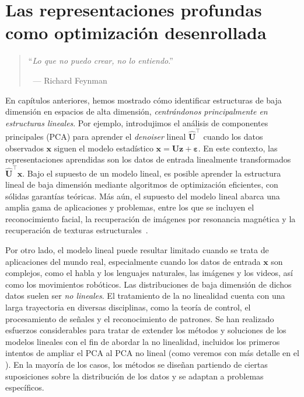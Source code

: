 \documentclass[../../book-main.tex]{subfiles}
\begin{document}
\chapter{Las representaciones profundas como optimización desenrollada}
\label{ch:deep-networks}

\begin{quote}
    \hfill    ``{\em Lo que no puedo crear, no lo entiendo}.''

    $~$ \hfill --- Richard Feynman
\end{quote}
\vspace{5mm}

En capítulos anteriores, hemos mostrado cómo identificar estructuras de baja dimensión
en espacios de alta dimensión, \textit{centrándonos principalmente en
estructuras lineales}.
Por ejemplo, introdujimos el análisis de componentes principales (PCA) para
aprender el \textit{denoiser} lineal $\hat{\bm{U}}^{\top}$ cuando los datos observados
$\bm{x}$ siguen el modelo estadístico $\bm{x} = \bm{U}\bm{z} +
\bm{\varepsilon}$.
En este contexto, las representaciones aprendidas son los datos de entrada linealmente
transformados $\hat{\bm{U}}^{\top}\bm{x}$.
Bajo el supuesto de un modelo lineal, es posible aprender la estructura lineal
de baja dimensión mediante algoritmos de optimización eficientes, con sólidas
garantías teóricas.
Más aún, el supuesto del modelo lineal abarca una amplia gama de
aplicaciones y problemas, entre los que se incluyen el reconocimiento facial, la
recuperación de imágenes por resonancia magnética y la recuperación de texturas estructurales~\cite{Wright-Ma-2022}.

Por otro lado, el modelo lineal puede resultar limitado cuando se trata de
aplicaciones del mundo real, especialmente cuando los datos de entrada $\bm{x}$ son
complejos, como el habla y los lenguajes naturales, las imágenes y los videos, así como
los movimientos robóticos. Las distribuciones de baja dimensión de dichos datos suelen ser
{\em no lineales}.
El tratamiento de la no linealidad cuenta con una larga trayectoria en diversas
disciplinas, como la teoría de control, el procesamiento de señales y el reconocimiento de patrones.
Se han realizado esfuerzos considerables para tratar de extender
los métodos y soluciones de los modelos lineales con el fin de abordar la no linealidad,
incluidos los primeros intentos de ampliar el PCA al PCA no lineal (como veremos
con más detalle en el ). En
la mayoría de los casos, los métodos se diseñan partiendo de 
ciertas suposiciones sobre la distribución de los datos
y se adaptan a problemas específicos.
\end{document}
